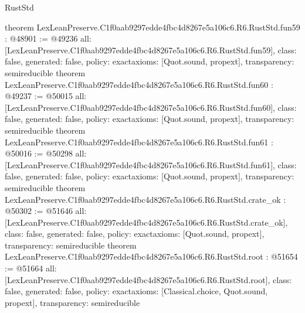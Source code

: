 \begin{lexlean}{RustStd}
\begin{coremodule}
{}
theorem LexLeanPreserve.C1f0aab9297edde4fbc4d8267e5a106c6.R6.RustStd.fun59 : @48901 := @49236 {
  all: [LexLeanPreserve.C1f0aab9297edde4fbc4d8267e5a106c6.R6.RustStd.fun59],
  class: false,
  generated: false,
  policy: exact{axioms: [Quot.sound, propext]},
  transparency: semireducible
}
theorem LexLeanPreserve.C1f0aab9297edde4fbc4d8267e5a106c6.R6.RustStd.fun60 : @49237 := @50015 {
  all: [LexLeanPreserve.C1f0aab9297edde4fbc4d8267e5a106c6.R6.RustStd.fun60],
  class: false,
  generated: false,
  policy: exact{axioms: [Quot.sound, propext]},
  transparency: semireducible
}
theorem LexLeanPreserve.C1f0aab9297edde4fbc4d8267e5a106c6.R6.RustStd.fun61 : @50016 := @50298 {
  all: [LexLeanPreserve.C1f0aab9297edde4fbc4d8267e5a106c6.R6.RustStd.fun61],
  class: false,
  generated: false,
  policy: exact{axioms: [Quot.sound, propext]},
  transparency: semireducible
}
theorem LexLeanPreserve.C1f0aab9297edde4fbc4d8267e5a106c6.R6.RustStd.crate_ok : @50302 := @51646 {
  all: [LexLeanPreserve.C1f0aab9297edde4fbc4d8267e5a106c6.R6.RustStd.crate_ok],
  class: false,
  generated: false,
  policy: exact{axioms: [Quot.sound, propext]},
  transparency: semireducible
}
theorem LexLeanPreserve.C1f0aab9297edde4fbc4d8267e5a106c6.R6.RustStd.root : @51654 := @51664 {
  all: [LexLeanPreserve.C1f0aab9297edde4fbc4d8267e5a106c6.R6.RustStd.root],
  class: false,
  generated: false,
  policy: exact{axioms: [Classical.choice, Quot.sound, propext]},
  transparency: semireducible
}


\end{coremodule}
\end{lexlean}

